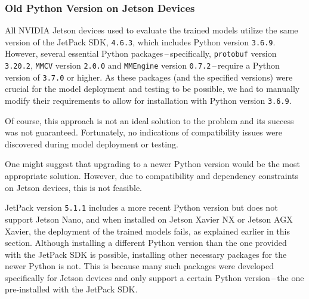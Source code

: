 \subsubsection*{Old Python Version on Jetson Devices}

All NVIDIA Jetson devices used to evaluate the trained models utilize the same
version of the JetPack SDK, \texttt{4.6.3}, which includes Python version
\texttt{3.6.9}. However, several essential Python packages\,--\,specifically,
\texttt{protobuf} version \texttt{3.20.2}, \texttt{MMCV} version \texttt{2.0.0}
and \texttt{MMEngine} version \texttt{0.7.2}\,--\,require a Python version of
\texttt{3.7.0} or higher. As these packages (and the specified versions) were
crucial for the model deployment and testing to be possible, we had to manually
modify their requirements to allow for installation with Python version
\texttt{3.6.9}.

Of course, this approach is not an ideal solution to the problem and its success
was not guaranteed.  Fortunately, no indications of compatibility issues were
discovered during model deployment or testing.

One might suggest that upgrading to a newer Python version would be the most
appropriate solution. However, due to compatibility and dependency constraints
on Jetson devices, this is not feasible.

JetPack version \texttt{5.1.1} includes a more recent Python version but does
not support Jetson Nano, and when installed on Jetson Xavier NX or Jetson AGX
Xavier, the deployment of the trained models fails, as explained earlier in this
section. Although installing a different Python version than the one provided
with the JetPack SDK is possible, installing other necessary packages for the
newer Python is not. This is because many such packages were developed
specifically for Jetson devices and only support a certain Python
version\,--\,the one pre-installed with the JetPack SDK.


